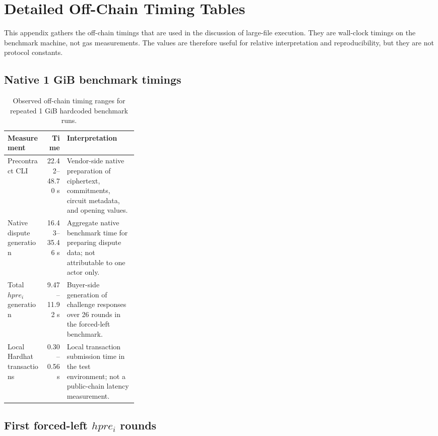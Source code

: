 \chapter{Detailed Off-Chain Timing Tables}
\label{app:offchain-timing-tables}

This appendix gathers the off-chain timings that are used in the discussion of large-file
execution. They are wall-clock timings on the benchmark machine, not gas measurements. The
values are therefore useful for relative interpretation and reproducibility, but they are
not protocol constants.

\section{Native 1 GiB benchmark timings}

\begin{table}[H]
  \centering
  \begin{tabularx}{\linewidth}{>{\raggedright\arraybackslash}p{0.30\linewidth}r>{\raggedright\arraybackslash}X}
    \toprule
    Measurement & Time & Interpretation \\
    \midrule
    Precontract CLI & 22.42--48.70 s & Vendor-side native preparation of ciphertext,
    commitments, circuit metadata, and opening values. \\
    Native dispute generation & 16.43--35.46 s & Aggregate native benchmark time for preparing
    dispute data; not attributable to one actor only. \\
    Total \(hpre_i\) generation & 9.47--11.92 s & Buyer-side generation of challenge responses
    over 26 rounds in the forced-left benchmark. \\
    Local Hardhat transactions & 0.30--0.56 s & Local transaction submission time in the test
    environment; not a public-chain latency measurement. \\
    \bottomrule
  \end{tabularx}
  \caption{Observed off-chain timing ranges for repeated 1 GiB hardcoded benchmark runs.}
  \label{tab:app-1gib-timings}
\end{table}

\section[First hpre rounds]{First forced-left \(hpre_i\) rounds}

